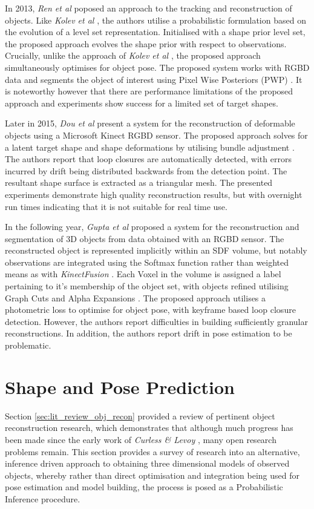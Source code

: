 {In 2013, \textit{Ren et al} \cite{Ren2013} poposed an approach to the tracking and reconstruction of 
objects. Like \textit{Kolev et al} \cite{Kolev2006}, the authors utilise a probabilistic formulation 
based on the evolution of a level set representation. Initialised with a shape prior level set, the 
proposed approach evolves the shape prior with respect to observations. Crucially, unlike the approach of 
\textit{Kolev et al} \cite{Kolev2006}, the proposed approach simultaneously optimises for object pose.
The proposed system works with RGBD data and segments the object of interest using Pixel Wise Posteriors 
(PWP) \cite{Bibby2008}. It is noteworthy however that there are performance limitations of the proposed 
approach and experiments show success for a limited set of target shapes.

Later in 2015, \textit{Dou et al} \cite{Dou2015} present a system for the reconstruction of deformable 
objects using a Microsoft Kinect RGBD sensor. The proposed approach solves for a latent target shape 
and shape deformations by utilising bundle adjustment \cite{Triggs1999}. The authors report that loop 
closures are automatically detected, with errors incurred by drift being distributed backwards from the 
detection point. The resultant shape surface is extracted as a triangular mesh. The presented experiments 
demonstrate high quality reconstruction results, but with overnight run times indicating that it is not 
suitable for real time use.

In the following year, \textit{Gupta et al} \cite{Gupta2016} proposed a system for the reconstruction and 
segmentation of 3D objects from data obtained with an RGBD sensor. The reconstructed object is represented 
implicitly within an SDF volume, but notably observations are integrated using the Softmax \cite{SOFTMAX} 
function rather than weighted means as with \textit{KinectFusion} \cite{Newcombe2011}. Each Voxel in the 
volume is assigned a label pertaining to it's membership of the object set, with objects refined utilising 
Graph Cuts and Alpha Expansions \cite{CLRS}. The proposed approach utilises a photometric loss to optimise 
for object pose, with keyframe based loop closure detection. However, the authors report difficulties in 
building sufficiently granular reconstructions. In addition, the authors report drift in pose estimation 
to be problematic.

\section{Shape and Pose Prediction}
\label{sec:lit_review_prediction}
Section \ref{sec:lit_review_obj_recon} provided a review of pertinent object reconstruction research, 
which demonstrates that although much progress has been made since the early work of \textit{Curless \& 
Levoy} \cite{Curless1996}, many open research problems remain. This section provides a survey of research 
into an alternative, inference driven approach to obtaining three dimensional models of observed 
objects, whereby rather than direct optimisation and integration being used for pose estimation and 
model building, the process is posed as a Probabilistic Inference procedure.

}
